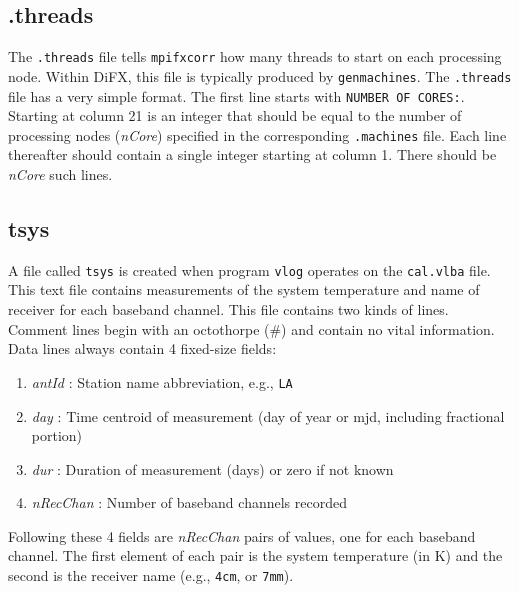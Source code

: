 
\subsection{.threads} \label{sec:threads}

The {\tt .threads} file tells {\tt mpifxcorr} how many threads to start on each processing node.
Within DiFX, this file is typically produced by {\tt genmachines}.
The {\tt.threads} file has a very simple format.
The first line starts with {\tt NUMBER OF CORES:}.
Starting at column 21 is an integer that should be equal to the number of processing nodes ({\em nCore}) specified in the corresponding {\tt .machines} file.
Each line thereafter should contain a single integer starting at column 1.
There should be {\em nCore} such lines.









\subsection{tsys} \label{sec:tsys}

A file called {\tt tsys} is created when program {\tt vlog} operates on the {\tt cal.vlba} file.
This text file contains measurements of the system temperature and name of receiver for each baseband channel.
This file contains two kinds of lines.
Comment lines begin with an octothorpe (\#) and contain no vital information.
Data lines always contain 4 fixed-size fields:
\begin{enumerate}
\item {\em antId} : Station name abbreviation, e.g., {\tt LA}
\item {\em day} : Time centroid of measurement (day of year or mjd, including fractional portion)
\item {\em dur} : Duration of measurement (days) or zero if not known
\item {\em nRecChan} : Number of baseband channels recorded 
\end{enumerate}
Following these 4 fields are {\em nRecChan} pairs of values, one for each baseband channel.
The first element of each pair is the system temperature (in K) and the second is the receiver name (e.g., {\tt 4cm}, or {\tt 7mm}).

